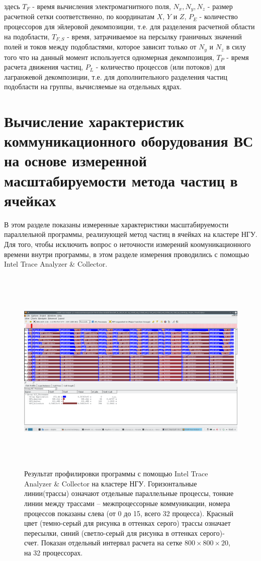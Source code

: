 		здесь $T_{F}$ - время вычисления электромагнитного поля, $N_x, N_y, N_z$ - размер расчетной сетки соответственно, по координатам $X$, $Y$ и $Z$, $P_E$ - количество процессоров для эйлеровой декомпозиции, т.е. для разделения расчетной области на подобласти, $T_{F,S}$ - время, затрачиваемое на персылку граничных значений полей и токов между подобластями, которое зависит только от $N_y$ и $N_z$ в силу того что на данный момент используется одномерная декомпозиция,  $T_P$ - время расчета движения частиц, $P_L$ - количество процессов (или потоков) для лагранжевой декомпозиции, т.е. для дополнительного разделения частиц подобласти на группы, вычисляемые на отдельных ядрах.	
			
		
		
		
	
	    \section{Вычисление характеристик коммуникационного оборудования ВС на основе измеренной масштабируемости метода частиц в ячейках}
	    
	    
	    
	    В этом разделе показаны измеренные характеристики масштабируемости параллельной программы, реализующей метод частиц в ячейках на кластере НГУ. Для того, чтобы исключить вопрос о неточности измерений коомуникационного времени внутри программы, в этом разделе измерения проводились с помощью Intel Trace Analyzer \& Collector.
	    
\begin{figure}[h]
\begin{center}
\includegraphics[height=10cm,keepaspectratio]{images/scalingNSU-img17.png}
\caption{
Результат профилировки программы с помощью Intel Trace Analyzer \& Collector на кластере НГУ. Горизонтальные линии(трассы) означают отдельные параллельные процессы, тонкие линии между трассами – межпроцессорные коммуникации, номера процессов показаны слева (от 0 до 15, всего 32 процесса). Красный цвет (темно-серый для рисунка в оттенках серого) трассы означает пересылки, синий (светло-серый для рисунка в оттенках серого)-счет. Показан отдельный интервал расчета на сетке $800\times800\times20$, на 32 процессорах.
}
\label{scale8}
\end{center} 
\end{figure}
	   
